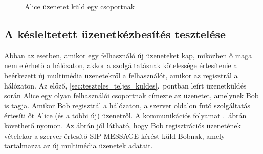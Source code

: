 \begin{figure}[htb]
\center
{}
\caption{Alice üzenetet küld egy csoportnak}
\label{fig:teszt-vtf-kuldes-01}
\end{figure}

\subsection{A késleltetett üzenetkézbesítés tesztelése}
\label{sec:teszteles_kesleltetett_kezbesites}

Abban az esetben, amikor egy felhasználó új üzeneteket kap, miközben ő maga nem elérhető a hálózaton, akkor a szolgáltatásnak kötelessége értesítenie a beérkezett új multimédia üzenetekről a felhasználót, amikor az regisztrál a hálózaton. Az előző, \ref{sec:teszteles_teljes_kuldes}.~pontban leírt üzenetküldés során Alice egy olyan felhasználói csoportnak címezte az üzenetet, amelynek Bob is tagja. Amikor Bob regisztrál a hálózaton, a szerver oldalon futó szolgáltatás értesíti őt Alice (és a többi új) üzenetről. A kommunikációs folyamat .~ábrán követhető nyomon. Az ábrán jól látható, hogy Bob regisztrációs üzenetének vételekor a szerver értesítő SIP MESSAGE kérést küld Bobnak, amely tartalmazza az új multimédia üzenetek adatait.

